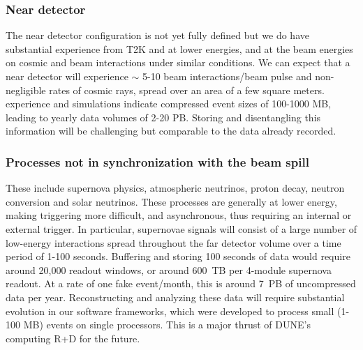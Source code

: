 \subsubsection{ Near detector} The near detector configuration is not yet fully defined  but we do have substantial experience from T2K and   at lower energies, and   at the   beam energies on cosmic and beam interactions under similar conditions.  We can expect that a near detector will experience $\sim$ 5-10 beam interactions/beam pulse and non-negligible rates of cosmic rays, spread over an area of a few square meters.  experience and  simulations indicate compressed event sizes of 100-1000 MB, leading to yearly data volumes of 2-20 PB.  Storing and disentangling this information will be challenging but comparable to the  data already recorded. 








\subsubsection{Processes not in synchronization with the beam spill} These include supernova physics, atmospheric neutrinos, proton decay, neutron conversion and solar neutrinos.  These processes are generally at lower energy, making triggering more difficult, and asynchronous, thus requiring an internal or external trigger.  In particular, supernovae signals will consist of a large number of low-energy interactions spread throughout the far detector volume over a time period of 1-100 seconds. Buffering and storing 100 seconds of data would require around 20,000 readout windows, or around 600~TB per 4-module supernova readout.  At a rate of one fake  event/month, this is around 7~PB of uncompressed data per year.  Reconstructing and analyzing these data will require substantial evolution in our software frameworks, which were developed to process small (1-100 MB) events on single processors. This is a major thrust of DUNE's computing R+D for the future. 

